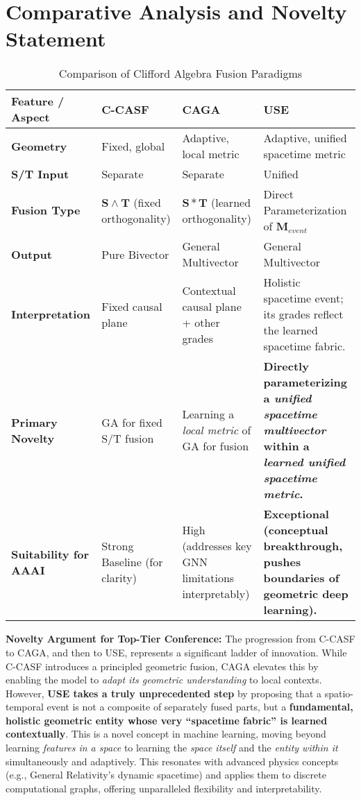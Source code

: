 \documentclass[11pt]{article}
\newcommand{\Svec}{\mathbf{S}} %
\newcommand{\Tvec}{\mathbf{T}} %
\newcommand{\Mvec}{\mathbf{M}} %
\begin{document}
\clearpage

\section{Comparative Analysis and Novelty Statement}

\begin{table}[h!]
\centering
\caption{Comparison of Clifford Algebra Fusion Paradigms}
\label{tab:comparison}
\begin{tabular}{@{}llll@{}}
\toprule
\textbf{Feature / Aspect} & \textbf{C-CASF} & \textbf{CAGA} & \textbf{USE} \\
\midrule
\textbf{Geometry} & Fixed, global & Adaptive, local metric & Adaptive, unified spacetime metric \\
\textbf{S/T Input} & Separate & Separate & Unified \\
\textbf{Fusion Type} & $\Svec \wedge \Tvec$ (fixed orthogonality) & $\Svec * \Tvec$ (learned orthogonality) & Direct Parameterization of $\Mvec_{event}$ \\
\textbf{Output} & Pure Bivector & General Multivector & General Multivector \\
\textbf{Interpretation} & Fixed causal plane & Contextual causal plane + other grades & Holistic spacetime event; its grades reflect the learned spacetime fabric. \\
\textbf{Primary Novelty} & GA for fixed S/T fusion & Learning a \textit{local metric} of GA for fusion & \textbf{Directly parameterizing a \textit{unified spacetime multivector} within a \textit{learned unified spacetime metric}.} \\
\textbf{Suitability for AAAI} & Strong Baseline (for clarity) & High (addresses key GNN limitations interpretably) & \textbf{Exceptional (conceptual breakthrough, pushes boundaries of geometric deep learning).} \\
\bottomrule
\end{tabular}
\end{table}

\textbf{Novelty Argument for Top-Tier Conference:}
The progression from C-CASF to CAGA, and then to USE, represents a significant ladder of innovation. While C-CASF introduces a principled geometric fusion, CAGA elevates this by enabling the model to \textit{adapt its geometric understanding} to local contexts. However, \textbf{USE takes a truly unprecedented step} by proposing that a spatio-temporal event is not a composite of separately fused parts, but a \textbf{fundamental, holistic geometric entity whose very ``spacetime fabric'' is learned contextually}. This is a novel concept in machine learning, moving beyond learning \textit{features in a space} to learning the \textit{space itself} and the \textit{entity within it} simultaneously and adaptively. This resonates with advanced physics concepts (e.g., General Relativity's dynamic spacetime) and applies them to discrete computational graphs, offering unparalleled flexibility and interpretability.
\end{document}

